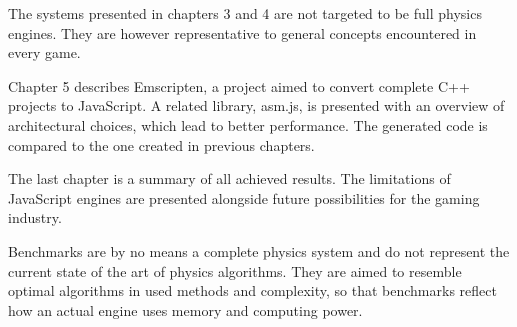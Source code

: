 The systems presented in chapters 3 and 4 are not targeted to be full physics engines. They are however representative to general concepts encountered in every game.

Chapter 5 describes Emscripten, a project aimed to convert complete C++ projects to JavaScript. A related library, asm.js, is presented with an overview of architectural choices, which lead to better performance. The generated code is compared to the one created in previous chapters.

The last chapter is a summary of all achieved results. The limitations of JavaScript engines are presented alongside future possibilities for the gaming industry.

Benchmarks are by no means a complete physics system and do not represent the current state of the art of physics algorithms. They are aimed to resemble optimal algorithms in used methods and complexity, so that benchmarks reflect how an actual engine uses memory and computing power.

